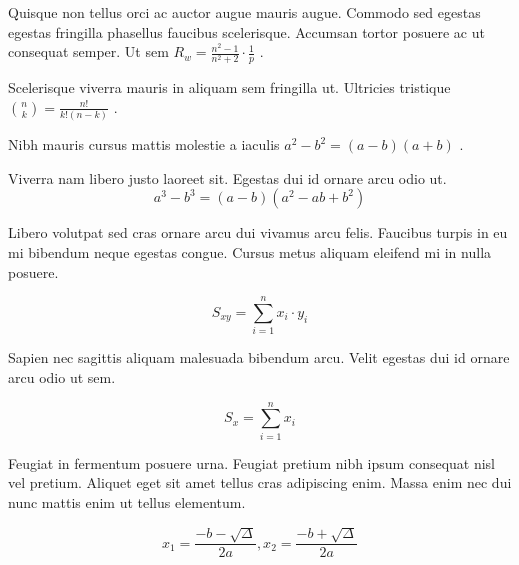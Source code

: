 \documentclass{article}
\begin{document}
Quisque non tellus orci ac auctor augue mauris augue. Commodo sed egestas egestas fringilla phasellus faucibus scelerisque. Accumsan tortor posuere ac ut consequat semper. Ut sem 
\begin{math}
	R_w=\frac{n^2-1}{n^2+2} \cdot \frac{1}{p}
\end{math}
.\newline

Scelerisque viverra mauris in aliquam sem fringilla ut. Ultricies tristique 
$ {n \choose k}=\frac{n!}{k!(n-k)} $
.\newline

Nibh mauris cursus mattis molestie a iaculis 
\( a^2-b^2=(a-b)(a+b) \)
.\newline

Viverra nam libero justo laoreet sit. Egestas dui id ornare arcu odio ut.
\[ a^3-b^3=(a-b)(a^2-ab+b^2) \]

Libero volutpat sed cras ornare arcu dui vivamus arcu felis. Faucibus turpis in eu mi bibendum neque egestas congue. Cursus metus aliquam eleifend mi in nulla posuere.

$$ S_{xy}=\sum_{i=1}^{n}x_i\cdot y_i $$

Sapien nec sagittis aliquam malesuada bibendum arcu. Velit egestas dui id ornare arcu odio ut sem. 

\begin{displaymath}
	S_x=\sum_{i=1}^{n}x_i
\end{displaymath}

Feugiat in fermentum posuere urna. Feugiat pretium nibh ipsum consequat nisl vel pretium. Aliquet eget sit amet tellus cras adipiscing enim. Massa enim nec dui nunc mattis enim ut tellus elementum.

\begin{equation}
	x_1=\frac{-b-\sqrt{\Delta}}{2a},x_2=\frac{-b+\sqrt{\Delta}}{2a}
\end{equation}
\end{document}
